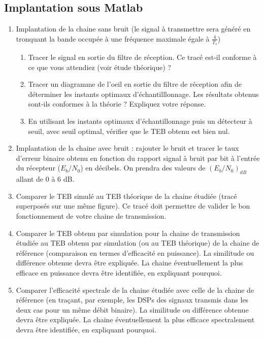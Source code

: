 \documentclass{article}
\begin{document}
\subsection{Implantation sous Matlab}
    \begin{enumerate}
        \item Implantation de la chaine sans bruit (le signal à transmettre sera généré en tronquant la bande occupée à une fréquence maximale égale à $\frac{4}{T_s}$)
            \begin{enumerate}
                \item Tracer le signal en sortie du filtre de réception. Ce tracé est-il conforme à ce que vous attendiez (voir étude théorique) ?
                \item Tracer un diagramme de l'oeil en sortie du filtre de réception afin de déterminer les instants optimaux d'échantilllonnage. Les résultats obtenus sont-ils conformes à la théorie ? Expliquez votre réponse.
                \item En utilisant les instants optimaux d'échantillonnage puis un détecteur à seuil, avec seuil optimal, vérifier que le TEB obtenu est bien nul.
            \end{enumerate}
        \item Implantation de la chaine avec bruit : rajouter le bruit et tracer le taux d'erreur binaire obtenu en fonction du rapport signal à bruit par bit à l'entrée du récepteur ($E_b/N_0$) en décibels. On prendra des valeurs de $\left(E_b/N_0\right)_{dB}$ allant de $0$ à $6$ dB.
        \item Comparer le TEB simulé au TEB théorique de la chaine étudiée (tracé superposés sur une même figure). Ce tracé doit permettre de valider le bon fonctionnement de votre chaine de transmission.\\
        \item Comparer le TEB obtenu par simulation pour la chaine de transmission étudiée au TEB obtenu par simulation (ou au TEB théorique) de la chaine de référence (comparaison en termes d'efficacité en puissance). La similitude ou différence obtenue devra être expliquée. La chaine éventuellement la plus efficace en puissance devra être identifiée, en expliquant pourquoi.\\
        \item Comparer l'efficacité spectrale de la chaine étudiée avec celle de la chaine de référence (en traçant, par exemple, les DSPs des signaux transmis dans les deux cas pour un même débit binaire). La similitude ou différence obtenue devra être expliquée. La chaine éventuellement la plus efficace spectralement devra être identifiée, en expliquant pourquoi.\\
    \end{enumerate}
\end{document}
